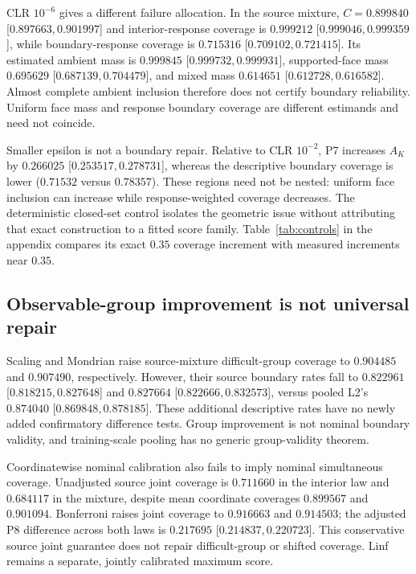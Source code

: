 \documentclass{article}
\theoremstyle{plain}
\begin{document}
CLR $10^{-6}$ gives a different failure allocation. In the source mixture, $C=0.899840$ [$0.897663,0.901997$] and interior-response coverage is $0.999212$ [$0.999046,0.999359$], while boundary-response coverage is $0.715316$ [$0.709102,0.721415$]. Its estimated ambient mass is $0.999845$ [$0.999732,0.999931$], supported-face mass $0.695629$ [$0.687139,0.704479$], and mixed mass $0.614651$ [$0.612728,0.616582$]. Almost complete ambient inclusion therefore does not certify boundary reliability. Uniform face mass and response boundary coverage are different estimands and need not coincide.

Smaller epsilon is not a boundary repair. Relative to CLR $10^{-2}$, P7 increases $A_K$ by $0.266025$ [$0.253517,0.278731$], whereas the descriptive boundary coverage is lower ($0.71532$ versus $0.78357$). These regions need not be nested: uniform face inclusion can increase while response-weighted coverage decreases. The deterministic closed-set control isolates the geometric issue without attributing that exact construction to a fitted score family. Table~\ref{tab:controls} in the appendix compares its exact $0.35$ coverage increment with measured increments near $0.35$.

\subsection{Observable-group improvement is not universal repair}
Scaling and Mondrian raise source-mixture difficult-group coverage to $0.904485$ and $0.907490$, respectively. However, their source boundary rates fall to $0.822961$ [$0.818215,0.827648$] and $0.827664$ [$0.822666,0.832573$], versus pooled L2's $0.874040$ [$0.869848,0.878185$]. These additional descriptive rates have no newly added confirmatory difference tests. Group improvement is not nominal boundary validity, and training-scale pooling has no generic group-validity theorem.

Coordinatewise nominal calibration also fails to imply nominal simultaneous coverage. Unadjusted source joint coverage is $0.711660$ in the interior law and $0.684117$ in the mixture, despite mean coordinate coverages $0.899567$ and $0.901094$. Bonferroni raises joint coverage to $0.916663$ and $0.914503$; the adjusted P8 difference across both laws is $0.217695$ [$0.214837,0.220723$]. This conservative source joint guarantee does not repair difficult-group or shifted coverage. Linf remains a separate, jointly calibrated maximum score.

\begin{table}[t]
\caption{All ten frozen aggregate effects, first minus second. Both interval columns use paired seed-cluster percentile bootstraps: 95\% is descriptive; 99.5\% is approximately family-adjusted across these ten effects. P1--P10 definitions and averaging cells are specified in Appendix~\ref{app:contrasts}; S denotes source, T shifted, Z the zero-mixture law, and Both both laws. All effects average the three dimensions. Effects are absolute coverage or normalized-mass differences, not relative percentages.}
\label{tab:contrasts}
\centering

\end{table}
\end{document}
